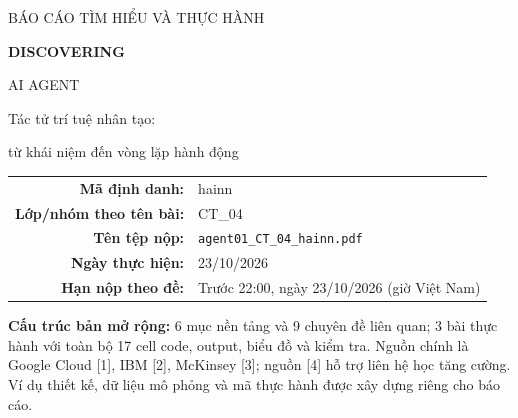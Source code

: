 \documentclass[11pt,a4paper]{article}
\begin{document}
\begin{titlepage}
\centering
\vspace*{2.3cm}
{\large\sffamily BÁO CÁO TÌM HIỂU VÀ THỰC HÀNH\par}
\vspace{1.0cm}
{\Huge\bfseries\color{ink} DISCOVERING\par AI AGENT\par}
\vspace{0.6cm}
{\Large Tác tử trí tuệ nhân tạo:\par từ khái niệm đến vòng lặp hành động\par}
\vspace{1.5cm}
\vfill
\begin{tabular}{rl}
\textbf{Mã định danh:}&hainn\\[5pt]
\textbf{Lớp/nhóm theo tên bài:}&CT\_04\\[5pt]
\textbf{Tên tệp nộp:}&\texttt{agent01\_CT\_04\_hainn.pdf}\\[5pt]
\textbf{Ngày thực hiện:}&23/10/2026\\[5pt]
\textbf{Hạn nộp theo đề:}&Trước 22:00, ngày 23/10/2026 (giờ Việt Nam)
\end{tabular}
\vspace{1.0cm}

\begin{minipage}{0.9\linewidth}\small
\textbf{Cấu trúc bản mở rộng:} 6 mục nền tảng và 9 chuyên đề liên quan;
3 bài thực hành với toàn bộ 17 cell code, output, biểu đồ và kiểm tra.
Nguồn chính là Google Cloud [1], IBM [2], McKinsey [3]; nguồn [4] hỗ trợ liên hệ học tăng cường.
Ví dụ thiết kế, dữ liệu mô phỏng và mã thực hành được xây dựng riêng cho báo cáo.
\end{minipage}
\end{titlepage}
\renewcommand{\contentsname}{Mục lục}
\setcounter{tocdepth}{1}
\tableofcontents
\newpage
{}
\setcounter{page}{1}
\end{document}
